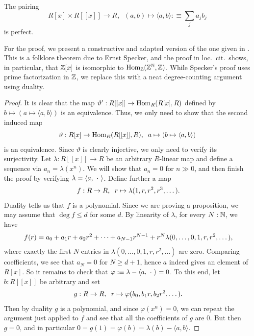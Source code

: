 \begin{lemma}\label{lem:perfect-pairing-powerseries-polynomials}
  The pairing
  \[
    R[x] \times R[[x]] \to R, \;\;
    (a,b) \mapsto \langle a,b \rangle :\equiv \sum_j a_jb_j
  \]
  is perfect.
\end{lemma}

For the proof, we present a constructive and adapted version of the one given in \cite[Satz 1]{Specker1950}.
This is a folklore theorem due to Ernst Specker, and the proof in loc.\ cit.\ shows, in particular, that $\mathbb{Z}[x]$ is isomorphic to $\mathrm{Hom}_{\mathbb{Z}}(\mathbb{Z}^{\mathbb{N}}, \mathbb{Z})$.
While Specker's proof uses prime factorization in $\mathbb{Z}$, we replace this with a neat degree-counting argument using duality.

\begin{proof}
  It is clear that the map $\vartheta' : R[[x]] \to \mathrm{Hom}_R(R[x],R)$ defined by $b \mapsto (a \mapsto \langle a,b \rangle)$ is an equivalence. Thus, we only need to show that the second induced map
  \[
    \vartheta:
    R[x] \to \mathrm{Hom}_R(R[[x]],R), \;\;
    a \mapsto \left(b \mapsto \langle a,b \rangle\right)
  \]
  is an equivalence.
  Since $\vartheta$ is clearly injective, we only need to verify its surjectivity.
  Let $\lambda : R[[x]] \to R$ be an arbitrary $R$-linear map and define a sequence via $a_n = \lambda(x^n)$. %
  We will show that $a_n = 0$ for $n \gg 0$, and then finish the proof by verifying $\lambda = \langle a, \ \cdot\  \rangle$.
  Define further a map
  \[
    f : R \to R, \;\;
    r \mapsto \lambda(1,r,r^2,r^3,\dots)\rlap{.}
  \]
  Duality tells us that $f$ is a polynomial.
  Since we are proving a proposition, we may assume that $\deg f \leq d$ for some $d$.
  By linearity of $\lambda$, for every $N : \mathbb{N}$, we have
  \[
    f(r) = a_0 + a_1r + a_2r^2 + \dots + a_{N-1}r^{N-1} + r^N\lambda(0,\dots,0,1,r,r^2,\dots)\rlap{,}
  \]
  where exactly the first $N$ entries in $\lambda(0,\dots,0,1,r,r^2,\dots)$ are zero.
  Comparing coefficients, we see that $a_N=0$ for $N \geq d+1$, hence $a$ indeed gives an element of $R[x]$.
  So it remains to check that $\varphi : \equiv \lambda - \langle a, \ \cdot\  \rangle = 0$.
  To this end, let $b : R[[x]]$ be arbitrary and set
  \[
    g:R \to R, \;\;
    r \mapsto \varphi(b_0,b_1r,b_2r^2,\dots)\rlap{.}
  \]
  Then by duality $g$ is a polynomial, and since $\varphi(x^n) = 0$, we can repeat the argument just applied to $f$ and see that all the coefficients of $g$ are $0$.
  But then $g=0$, and in particular $0 = g(1) = \varphi(b) = \lambda(b) - \langle a,b \rangle$.
\end{proof}

